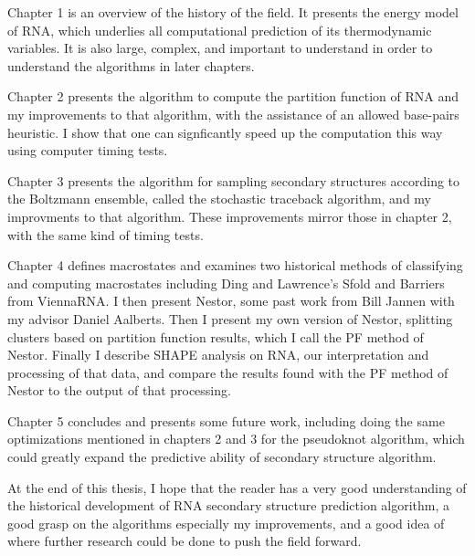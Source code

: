 Chapter 1 is an overview of the history of the field. It presents the
energy model of RNA, which underlies all computational prediction of
its thermodynamic variables. It is also large, complex, and important
to understand in order to understand the algorithms in later chapters.

Chapter 2 presents the algorithm to compute the partition function of
RNA and my improvements to that algorithm, with the assistance of an
allowed base-pairs heuristic. I show that one can signficantly speed
up the computation this way using computer timing tests. 

Chapter 3 presents the algorithm for sampling secondary structures
according to the Boltzmann ensemble, called the stochastic traceback
algorithm, and my improvments to that algorithm. These improvements
mirror those in chapter 2, with the same kind of timing tests.

Chapter 4 defines macrostates and examines two historical methods of
classifying and computing macrostates including Ding and Lawrence's
Sfold and Barriers from ViennaRNA. I then present Nestor, some past
work from Bill Jannen with my advisor Daniel Aalberts. Then I present
my own version of Nestor, splitting clusters based on partition
function results, which I call the PF method of Nestor. Finally I
describe SHAPE analysis on RNA, our interpretation and processing of
that data, and compare the results found with the PF method of Nestor
to the output of that processing. 

Chapter 5 concludes and presents some future work, including doing the
same optimizations mentioned in chapters 2 and 3 for the pseudoknot
algorithm, which could greatly expand the predictive ability of
secondary structure algorithm.

At the end of this thesis, I hope that the reader has a very good
understanding of the historical development of RNA secondary structure
prediction algorithm, a good grasp on the algorithms especially my
improvements, and a good idea of where further research could be done
to push the field forward.


